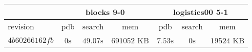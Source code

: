 \documentclass[a4paper,12pt]{scrartcl}
\begin{document}

\begin{tabular}{|l|c|c|c|c|c|c|}\hline
& \multicolumn{3}{c|}{blocks 9-0} & \multicolumn{3}{c|}{logistics00 5-1}\\\hline
revision & pdb & search & mem & pdb & search & mem\\\hline
$4b60266162fb$ & $0$s & $49.07$s & $691052$ KB & $7.53$s & $0$s & $19524$ KB\\\hline
\end{tabular}
\end{document}
